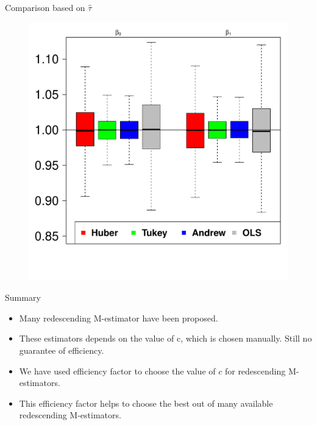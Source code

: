 \documentclass[english,svgnames,notes=hide,14pt]{beamer}
\begin{document}
\begin{frame}{Comparison based on $\hat{\tau}$}
\begin{figure}
\begin{center}
\includegraphics[scale=0.38]{imgs/box.pdf}
\end{center}
\end{figure}
\end{frame}

\begin{frame}{Summary}
\begin{itemize}
    \item Many redescending M-estimator have been proposed.
    \item These estimators depends on the value of c, which is chosen manually. Still no guarantee of efficiency. 
    \item We have used efficiency factor to choose the value of $c$ for redescending M-estimators. 
    \item This efficiency factor helps to choose the best out of many available redescending M-estimators.  
\end{itemize}

    
\end{frame}
\end{document}
